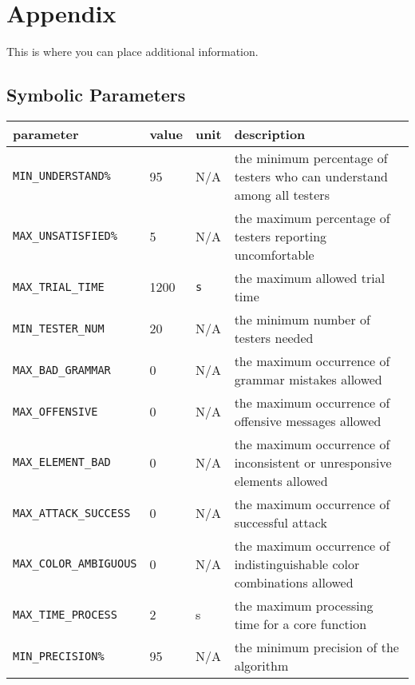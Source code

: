\documentclass[12pt, titlepage]{article}
\begin{document}
\newpage

\section{Appendix}

This is where you can place additional information.

\subsection{Symbolic Parameters}

\begin{longtable}{|l|l|l|p{5cm}|}

\hline
parameter & value & unit & description\\
\hline
\texttt{MIN\_UNDERSTAND\%}\label{MIN_UNDERSTAND} & 95 & N/A & the minimum percentage of testers who can understand among all testers\\
\hline
\texttt{MAX\_UNSATISFIED\%}\label{MAX_UNSATISFIED} & 5 & N/A & the maximum percentage of testers reporting uncomfortable\\
\hline
\texttt{MAX\_TRIAL\_TIME}\label{MAX_TRIAL_TIME} & 1200 & \texttt{s} & the maximum allowed trial time\\
\hline
\texttt{MIN\_TESTER\_NUM}\label{MIN_TESTER_NUM} &  20& N/A & the minimum number of testers needed\\
\hline
\texttt{MAX\_BAD\_GRAMMAR}\label{MAX_BAD_GRAMMAR} & 0& N/A & the maximum occurrence of grammar mistakes allowed \\
\hline
\texttt{MAX\_OFFENSIVE}\label{MAX_OFFENSIVE} & 0& N/A & the maximum occurrence of offensive messages allowed\\
\hline
\texttt{MAX\_ELEMENT\_BAD}\label{MAX_ELEMENT_BAD} & 0& N/A & the maximum occurrence of inconsistent 
 or unresponsive elements allowed\\
\hline
\texttt{MAX\_ATTACK\_SUCCESS}\label{MAX_ATTACK_SUCCESS} & 0& N/A & the maximum occurrence of successful attack\\
\hline
\texttt{MAX\_COLOR\_AMBIGUOUS}\label{MAX_COLOR_AMBIGUOUS} & 0& N/A & the maximum occurrence of indistinguishable color combinations allowed\\
\hline
\texttt{MAX\_TIME\_PROCESS}\label{MAX_TIME_PROCESS} & 2& s & the maximum processing time for a core function\\
\hline
\texttt{MIN\_PRECISION\%}\label{MIN_PRECISION} & 95 & N/A & the minimum precision of the algorithm\\

\end{longtable}
\end{document}
